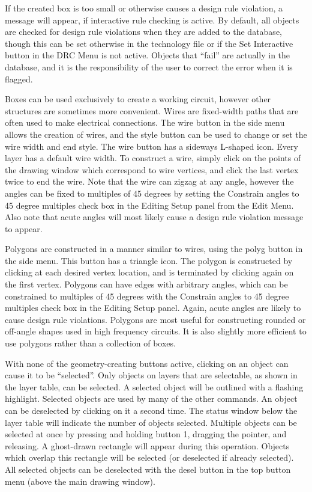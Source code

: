 If the created box is too small or otherwise causes a design rule
violation, a message will appear, if interactive rule checking is
active.  By default, all objects are checked for design rule
violations when they are added to the database, though this can be set
otherwise in the technology file or if the {\cb Set Interactive}
button in the {\cb DRC Menu} is not active.  Objects that ``fail'' are
actually in the database, and it is the responsibility of the user to
correct the error when it is flagged.

Boxes can be used exclusively to create a working circuit, however
other structures are sometimes more convenient.  Wires are fixed-width
paths that are often used to make electrical connections.  The {\cb
wire} button in the side menu allows the creation of wires, and the
{\cb style} button can be used to change or set the wire width and end
style.  The {\cb wire} button has a sideways L-shaped icon.  Every
layer has a default wire width.  To construct a wire, simply click on
the points of the drawing window which correspond to wire vertices,
and click the last vertex twice to end the wire.  Note that the wire
can zigzag at any angle, however the angles can be fixed to multiples
of 45 degrees by setting the {\cb Constrain angles to 45 degree
multiples} check box in the {\cb Editing Setup} panel from the {\cb
Edit Menu}.  Also note that acute angles will most likely cause a
design rule violation message to appear.

Polygons are constructed in a manner similar to wires, using the {\cb
polyg} button in the side menu.  This button has a triangle icon.  The
polygon is constructed by clicking at each desired vertex location,
and is terminated by clicking again on the first vertex.  Polygons can
have edges with arbitrary angles, which can be constrained to
multiples of 45 degrees with the {\cb Constrain angles to 45 degree
multiples} check box in the {\cb Editing Setup} panel.  Again, acute
angles are likely to cause design rule violations.  Polygons are most
useful for constructing rounded or off-angle shapes used in high
frequency circuits.  It is also slightly more efficient to use
polygons rather than a collection of boxes.

With none of the geometry-creating buttons active, clicking on an
object can cause it to be ``selected''.  Only objects on layers that
are selectable, as shown in the layer table, can be selected.  A
selected object will be outlined with a flashing highlight.  Selected
objects are used by many of the other commands.  An object can be
deselected by clicking on it a second time.  The status window below
the layer table will indicate the number of objects selected. 
Multiple objects can be selected at once by pressing and holding
button 1, dragging the pointer, and releasing.  A ghost-drawn
rectangle will appear during this operation.  Objects which overlap
this rectangle will be selected (or deselected if already selected). 
All selected objects can be deselected with the {\cb desel} button in
the top button menu (above the main drawing window).

